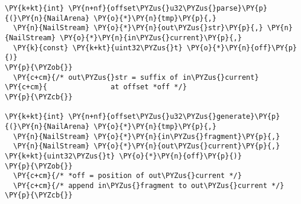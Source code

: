 \begin{Verbatim}[commandchars=\\\{\},codes={\catcode`\$=3\catcode`\^=7\catcode`\_=8}]
\PY{k+kt}{int} \PY{n+nf}{offset\PYZus{}u32\PYZus{}parse}\PY{p}{(}\PY{n}{NailArena} \PY{o}{*}\PY{n}{tmp}\PY{p}{,}
  \PY{n}{NailStream} \PY{o}{*}\PY{n}{out\PYZus{}str}\PY{p}{,} \PY{n}{NailStream} \PY{o}{*}\PY{n}{in\PYZus{}current}\PY{p}{,}
  \PY{k}{const} \PY{k+kt}{uint32\PYZus{}t} \PY{o}{*}\PY{n}{off}\PY{p}{)}
\PY{p}{\PYZob{}}
  \PY{c+cm}{/* out\PYZus{}str = suffix of in\PYZus{}current}
\PY{c+cm}{               at offset *off */}
\PY{p}{\PYZcb{}}

\PY{k+kt}{int} \PY{n+nf}{offset\PYZus{}u32\PYZus{}generate}\PY{p}{(}\PY{n}{NailArena} \PY{o}{*}\PY{n}{tmp}\PY{p}{,}
  \PY{n}{NailStream} \PY{o}{*}\PY{n}{in\PYZus{}fragment}\PY{p}{,}
  \PY{n}{NailStream} \PY{o}{*}\PY{n}{out\PYZus{}current}\PY{p}{,} \PY{k+kt}{uint32\PYZus{}t} \PY{o}{*}\PY{n}{off}\PY{p}{)}
\PY{p}{\PYZob{}}
  \PY{c+cm}{/* *off = position of out\PYZus{}current */}
  \PY{c+cm}{/* append in\PYZus{}fragment to out\PYZus{}current */}
\PY{p}{\PYZcb{}}
\end{Verbatim}
